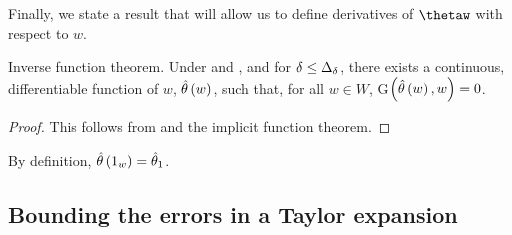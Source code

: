 Finally, we state a result that will allow us to define derivatives
of $\thetaw$ with respect to $w$.
\begin{lem}
\label{lem:implicit_function_theorem}Inverse function theorem. Under
\paperallcoreassum and , and for $\delta\le\Delta_{\delta}$,
there exists a continuous, differentiable function of $w$, $\hat{\theta}\left(w\right)$,
such that, for all $w\in W$, G$\left(\hat{\theta}\left(w\right),w\right)=0$.
\end{lem}
\begin{proof}
This follows from  and the implicit
function theorem.
\end{proof}
By definition, $\hat{\theta}\left(1_{w}\right)=\hat{\theta}_{1}$.






\subsection{Bounding the errors in a Taylor expansion}


